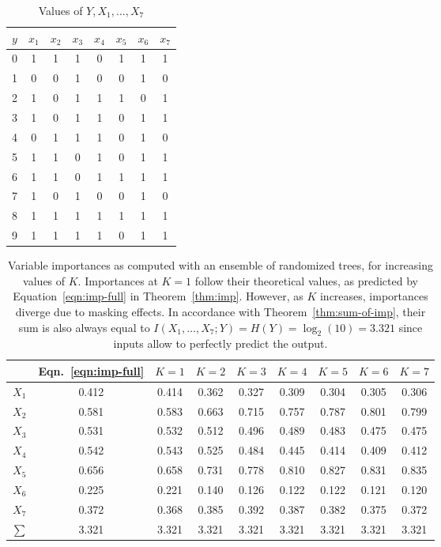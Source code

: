 \begin{table}
    \centering
    \begin{tabular}{| c | c c c c c c c |}
    \hline
    $y$ & $x_1$ & $x_2$ & $x_3$ & $x_4$ & $x_5$ & $x_6$ & $x_7$ \\
    \hline
    0 & 1 & 1 & 1 & 0 & 1 & 1 & 1 \\
    1 & 0 & 0 & 1 & 0 & 0 & 1 & 0 \\
    2 & 1 & 0 & 1 & 1 & 1 & 0 & 1 \\
    3 & 1 & 0 & 1 & 1 & 0 & 1 & 1 \\
    4 & 0 & 1 & 1 & 1 & 0 & 1 & 0 \\
    5 & 1 & 1 & 0 & 1 & 0 & 1 & 1 \\
    6 & 1 & 1 & 0 & 1 & 1 & 1 & 1 \\
    7 & 1 & 0 & 1 & 0 & 0 & 1 & 0 \\
    8 & 1 & 1 & 1 & 1 & 1 & 1 & 1 \\
    9 & 1 & 1 & 1 & 1 & 0 & 1 & 1 \\
    \hline
    \end{tabular}
    \caption{Values of $Y, X_1, ..., X_7$}
    \label{table:digits}
\end{table}

\begin{table}
    \begin{tabular}{| c | c c c c c c c c |}
    \hline
        & Eqn.~\ref{eqn:imp-full} & $K=1$ & $K=2$ & $K=3$ & $K=4$ & $K=5$ & $K=6$ & $K=7$ \\
    \hline
    $X_1$ & 0.412 & 0.414 & 0.362 & 0.327 & 0.309 & 0.304 & 0.305 & 0.306\\
    $X_2$ & 0.581 & 0.583 & 0.663 & 0.715 & 0.757 & 0.787 & 0.801 & 0.799\\
    $X_3$ & 0.531 & 0.532 & 0.512 & 0.496 & 0.489 & 0.483 & 0.475 & 0.475\\
    $X_4$ & 0.542 & 0.543 & 0.525 & 0.484 & 0.445 & 0.414 & 0.409 & 0.412\\
    $X_5$ & 0.656 & 0.658 & 0.731 & 0.778 & 0.810 & 0.827 & 0.831 & 0.835\\
    $X_6$ & 0.225 & 0.221 & 0.140 & 0.126 & 0.122 & 0.122 & 0.121 & 0.120\\
    $X_7$ & 0.372 & 0.368 & 0.385 & 0.392 & 0.387 & 0.382 & 0.375 & 0.372\\
    \hline
    $\sum$& 3.321 & 3.321 & 3.321 & 3.321 & 3.321 & 3.321 & 3.321 & 3.321\\
    \hline
    \end{tabular}
    \caption{Variable importances as computed with an ensemble of randomized trees, for increasing values of $K$. Importances at $K=1$ follow their theoretical values, as predicted by Equation~\ref{eqn:imp-full} in Theorem~\ref{thm:imp}. However, as $K$ increases,  importances diverge due to masking effects. In accordance with Theorem~\ref{thm:sum-of-imp}, their sum is also always equal to $I(X_{1}, \ldots, X_{7}; Y) = H(Y) = \log_{2}(10)= 3.321$ since inputs allow to perfectly predict the output.}
    \label{table:imp}
\end{table}

